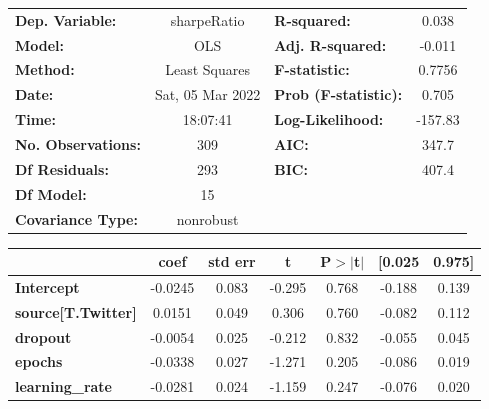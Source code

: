 \begin{center}
\begin{tabular}{lclc}
\toprule
\textbf{Dep. Variable:}              &   sharpeRatio    & \textbf{  R-squared:         } &     0.038   \\
\textbf{Model:}                      &       OLS        & \textbf{  Adj. R-squared:    } &    -0.011   \\
\textbf{Method:}                     &  Least Squares   & \textbf{  F-statistic:       } &    0.7756   \\
\textbf{Date:}                       & Sat, 05 Mar 2022 & \textbf{  Prob (F-statistic):} &    0.705    \\
\textbf{Time:}                       &     18:07:41     & \textbf{  Log-Likelihood:    } &   -157.83   \\
\textbf{No. Observations:}           &         309      & \textbf{  AIC:               } &     347.7   \\
\textbf{Df Residuals:}               &         293      & \textbf{  BIC:               } &     407.4   \\
\textbf{Df Model:}                   &          15      & \textbf{                     } &             \\
\textbf{Covariance Type:}            &    nonrobust     & \textbf{                     } &             \\
\bottomrule
\end{tabular}
\begin{tabular}{lcccccc}
                                     & \textbf{coef} & \textbf{std err} & \textbf{t} & \textbf{P$> |$t$|$} & \textbf{[0.025} & \textbf{0.975]}  \\
\midrule
\textbf{Intercept}                   &      -0.0245  &        0.083     &    -0.295  &         0.768        &       -0.188    &        0.139     \\
\textbf{source[T.Twitter]}           &       0.0151  &        0.049     &     0.306  &         0.760        &       -0.082    &        0.112     \\
\textbf{dropout}                     &      -0.0054  &        0.025     &    -0.212  &         0.832        &       -0.055    &        0.045     \\
\textbf{epochs}                      &      -0.0338  &        0.027     &    -1.271  &         0.205        &       -0.086    &        0.019     \\
\textbf{learning\_rate}              &      -0.0281  &        0.024     &    -1.159  &         0.247        &       -0.076    &        0.020     \\

\end{tabular}
\end{center}
